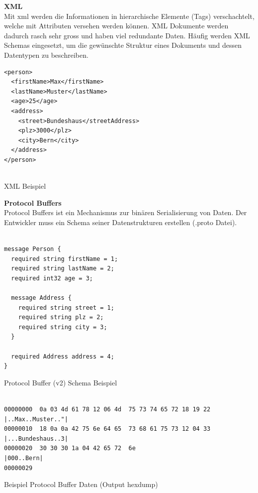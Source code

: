 \textbf{XML} \\
Mit \gls{xml} werden die Informationen in hierarchische Elemente (Tags) verschachtelt, welche mit Attributen versehen werden können. XML Dokumente werden dadurch rasch sehr gross und haben viel redundante Daten. Häufig werden XML Schemas eingesetzt, um die gewünschte Struktur eines Dokuments und dessen Datentypen zu beschreiben.

\begin{listing}[H]
\begin{verbatim}
<person>
  <firstName>Max</firstName>
  <lastName>Muster</lastName>
  <age>25</age>
  <address>
    <street>Bundeshaus</streetAddress>
    <plz>3000</plz>
    <city>Bern</city>
  </address>
</person>


\end{verbatim}
\caption{XML Beispiel}
\end{listing}



\textbf{Protocol Buffers} \\
Protocol Buffers ist ein Mechanismus zur binären Serialisierung von Daten. Der Entwickler muss ein Schema seiner Datenstrukturen erstellen (.proto Datei).

\begin{listing}[H]
\begin{verbatim}

message Person {
  required string firstName = 1;
  required string lastName = 2;
  required int32 age = 3;

  message Address {
    required string street = 1;
    required string plz = 2;
    required string city = 3;
  }
  
  required Address address = 4;
}

\end{verbatim}
\caption{Protocol Buffer (v2) Schema Beispiel}
\end{listing}


\begin{listing}[H]
\begin{verbatim}
               
00000000  0a 03 4d 61 78 12 06 4d  75 73 74 65 72 18 19 22  |..Max..Muster.."|
00000010  18 0a 0a 42 75 6e 64 65  73 68 61 75 73 12 04 33  |...Bundeshaus..3|
00000020  30 30 30 1a 04 42 65 72  6e                       |000..Bern|
00000029

\end{verbatim}
\caption{Beispiel Protocol Buffer Daten (Output hexdump)}
\end{listing}


